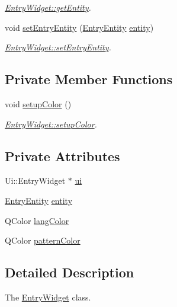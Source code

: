 \begin{DoxyCompactItemize}
\begin{DoxyCompactList}\small\item\em \hyperlink{class_entry_widget_aceac3096d3d475baa5cee08a1031d535}{Entry\+Widget\+::get\+Entity}. \end{DoxyCompactList}\item 
void \hyperlink{class_entry_widget_a771ca69a594426b14b0db88a69af0336}{set\+Entry\+Entity} (\hyperlink{class_entry_entity}{Entry\+Entity} \hyperlink{class_entry_widget_af215e0236b2829209fc5959185e4e294}{entity})
\begin{DoxyCompactList}\small\item\em \hyperlink{class_entry_widget_a771ca69a594426b14b0db88a69af0336}{Entry\+Widget\+::set\+Entry\+Entity}. \end{DoxyCompactList}\end{DoxyCompactItemize}
\subsection*{Private Member Functions}
\begin{DoxyCompactItemize}
\item 
void \hyperlink{class_entry_widget_acc64918b0faf33853d2aeeb85d53c3fd}{setup\+Color} ()
\begin{DoxyCompactList}\small\item\em \hyperlink{class_entry_widget_acc64918b0faf33853d2aeeb85d53c3fd}{Entry\+Widget\+::setup\+Color}. \end{DoxyCompactList}\end{DoxyCompactItemize}
\subsection*{Private Attributes}
\begin{DoxyCompactItemize}
\item 
Ui\+::\+Entry\+Widget $\ast$ \hyperlink{class_entry_widget_a2bba2d44d055b69a06391def732e6141}{ui}
\item 
\hyperlink{class_entry_entity}{Entry\+Entity} \hyperlink{class_entry_widget_af215e0236b2829209fc5959185e4e294}{entity}
\item 
Q\+Color \hyperlink{class_entry_widget_a6526e1c4616131455687396ffb04d5c0}{lang\+Color}
\item 
Q\+Color \hyperlink{class_entry_widget_aaac389b8064da69a2b02d63c9539f698}{pattern\+Color}
\end{DoxyCompactItemize}


\subsection{Detailed Description}
The \hyperlink{class_entry_widget}{Entry\+Widget} class. 

